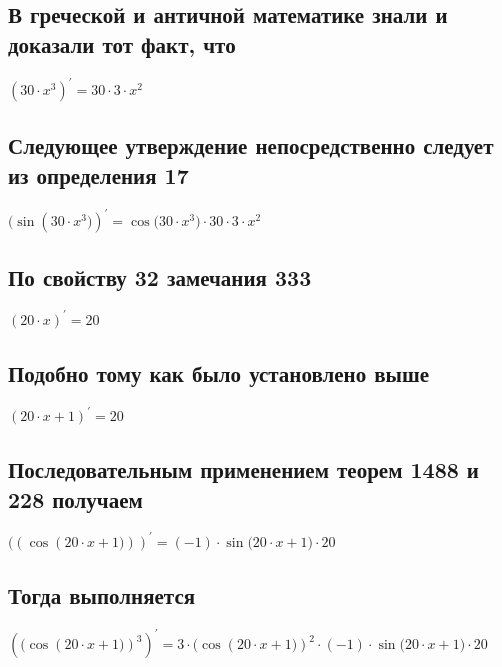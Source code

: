 \documentclass[12pt, letterpaper]{report}
\begin{document}
\subsection{В греческой и античной математике знали и доказали тот факт, что}
\begin{center} $({30}\cdot{{x}^{3}})^{\prime} = {30}\cdot{{3}\cdot{{x}^{2}}}$ \end{center} 

\subsection{Следующее утверждение непосредственно следует из определения 17}
\begin{center} $(\sin({{30}\cdot{{x}^{3}})})^{\prime} = {\cos({{30}\cdot{{x}^{3}})}}\cdot{{30}\cdot{{3}\cdot{{x}^{2}}}}$ \end{center} 

\subsection{По свойству 32 замечания 333}
\begin{center} $({20}\cdot{x})^{\prime} = 20$ \end{center} 

\subsection{Подобно тому как было установлено выше}
\begin{center} $({{20}\cdot{x}}+{1})^{\prime} = 20$ \end{center} 

\subsection{Последовательным применением теорем 1488 и 228 получаем}
\begin{center} $((\cos({{{20}\cdot{x}}+{1})}))^{\prime} = {{(-1)}\cdot{\sin({{{20}\cdot{x}}+{1})}}}\cdot{20}$ \end{center} 

\subsection{Тогда выполняется}
\begin{center} $({(\cos({{{20}\cdot{x}}+{1})})}^{3})^{\prime} = {{3}\cdot{{(\cos({{{20}\cdot{x}}+{1})})}^{2}}}\cdot{{{(-1)}\cdot{\sin({{{20}\cdot{x}}+{1})}}}\cdot{20}}$ \end{center} 
\end{document}
